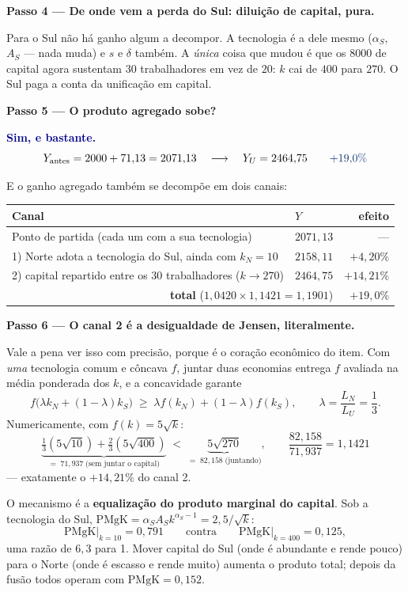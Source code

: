 \documentclass[11pt, a4paper]{article}
\newcommand{\passo}[1]{\medskip\noindent\textbf{#1}\par\nobreak}
\newcommand{\resp}[1]{%
  \ifmmode {\color{darkblue}#1}\else\textcolor{darkblue}{\textbf{#1}}\fi}
\begin{document}
\passo{Passo 4 --- De onde vem a perda do Sul: diluição de capital, pura.} Para o Sul não
há ganho algum a decompor. A tecnologia é a dele mesmo ($\alpha_S$, $A_S$ --- nada muda) e
$s$ e $\delta$ também. A \emph{única} coisa que mudou é que os $8000$ de capital agora
sustentam $30$ trabalhadores em vez de $20$: $k$ cai de $400$ para $270$. O Sul paga a
conta da unificação em capital.

\passo{Passo 5 --- O produto agregado sobe?} \resp{Sim, e bastante.}
$$Y_{\text{antes}} = 2000 + 71{,}13 = 2071{,}13
\quad\longrightarrow\quad Y_U = 2464{,}75
\qquad \resp{+19{,}0\%}$$

E o ganho agregado também se decompõe em dois canais:
\begin{center}
\small
\begin{tabular}{llr}
\toprule
\textbf{Canal} & \textbf{$Y$} & \textbf{efeito} \\
\midrule
Ponto de partida (cada um com a sua tecnologia)              & $2071{,}13$ & --- \\
1) Norte adota a tecnologia do Sul, ainda com $k_N=10$        & $2158{,}11$ & $+4{,}20\%$ \\
2) capital repartido entre os 30 trabalhadores ($k \to 270$)  & $2464{,}75$ & $+14{,}21\%$ \\
\midrule
\multicolumn{2}{r}{\textbf{total} \; ($1{,}0420 \times 1{,}1421 = 1{,}1901$)}
  & \textbf{$+19{,}0\%$} \\
\bottomrule
\end{tabular}
\end{center}

\passo{Passo 6 --- O canal 2 é a desigualdade de Jensen, literalmente.} Vale a pena ver
isso com precisão, porque é o coração econômico do item. Com \emph{uma} tecnologia comum e
côncava $f$, juntar duas economias entrega $f$ avaliada na média ponderada dos $k$, e a
concavidade garante
$$f\big(\lambda k_N + (1-\lambda)k_S\big) \;\geq\;
\lambda f(k_N) + (1-\lambda) f(k_S),
\qquad \lambda = \frac{L_N}{L_U} = \frac13 .$$
Numericamente, com $f(k) = 5\sqrt{k}$:
$$\underbrace{\tfrac13 (5\sqrt{10}) + \tfrac23 (5\sqrt{400})}_{= \;71{,}937\;\text{(sem juntar o capital)}}
\;<\;
\underbrace{5\sqrt{270}}_{=\;82{,}158\;\text{(juntando)}},
\qquad \frac{82{,}158}{71{,}937} = 1{,}1421$$
--- exatamente o $+14{,}21\%$ do canal 2. \checkmark

O mecanismo é a \textbf{equalização do produto marginal do capital}. Sob a tecnologia do
Sul, $\mathrm{PMgK} = \alpha_S A_S k^{\alpha_S - 1} = 2{,}5/\sqrt{k}$:
$$\mathrm{PMgK}\big|_{k=10} = 0{,}791
\qquad\text{contra}\qquad
\mathrm{PMgK}\big|_{k=400} = 0{,}125 ,$$
uma razão de $6{,}3$ para 1. Mover capital do Sul (onde é abundante e rende pouco) para o
Norte (onde é escasso e rende muito) aumenta o produto total; depois da fusão todos operam
com $\mathrm{PMgK} = 0{,}152$.
\end{document}
